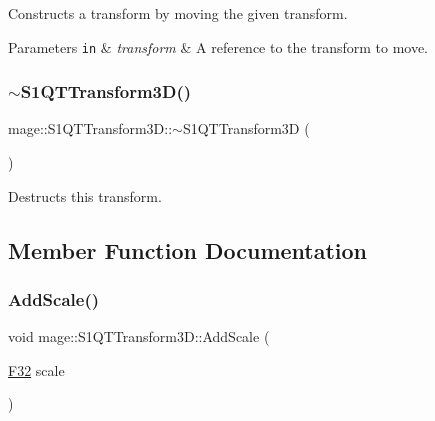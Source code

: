 Constructs a transform by moving the given transform.


\begin{DoxyParams}[1]{Parameters}
\mbox{\tt in}  & {\em transform} & A reference to the transform to move. \\
\hline
\end{DoxyParams}
\mbox{\label{classmage_1_1_s1_q_t_transform3_d_a382eb8d05d2f33f08268d310fed024de}} 
\subsubsection{\texorpdfstring{$\sim$\+S1\+Q\+T\+Transform3\+D()}{~S1QTTransform3D()}}
{\footnotesize\ttfamily mage\+::\+S1\+Q\+T\+Transform3\+D\+::$\sim$\+S1\+Q\+T\+Transform3D (\begin{DoxyParamCaption}{ }\end{DoxyParamCaption})\hspace{0.3cm}{\ttfamily [default]}}

Destructs this transform. 

\subsection{Member Function Documentation}
\mbox{\label{classmage_1_1_s1_q_t_transform3_d_a18d0ee2e8bd12407ae3a2ed53e74c628}} 
\subsubsection{\texorpdfstring{Add\+Scale()}{AddScale()}}
{\footnotesize\ttfamily void mage\+::\+S1\+Q\+T\+Transform3\+D\+::\+Add\+Scale (\begin{DoxyParamCaption}\item[{\mbox{\hyperlink{namespacemage_aa97e833b45f06d60a0a9c4fc22ae02c0}{F32}}}]{scale }\end{DoxyParamCaption})\hspace{0.3cm}{\ttfamily [noexcept]}}


